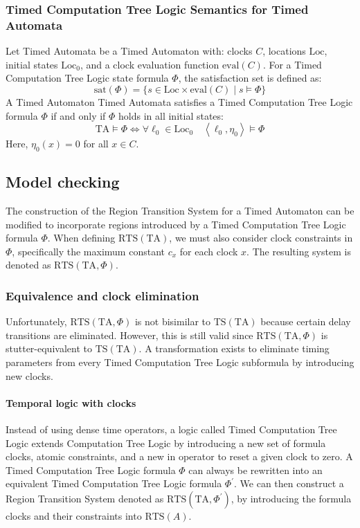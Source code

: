 \subsubsection{Timed Computation Tree Logic Semantics for Timed Automata}
Let Timed Automata be a Timed Automaton with: clocks $C$, locations $\text{Loc}$, initial states $\text{Loc}_0$, and a clock evaluation function $\text{eval}(C)$. 
For a Timed Computation Tree Logic state formula $\Phi$, the satisfaction set is defined as:
\[\text{sat}(\Phi)=\{s\in\text{Loc}\times\text{eval}(C)\mid s\models\Phi\}\]
A Timed Automaton Timed Automata satisfies a Timed Computation Tree Logic formula $\Phi$ if and only if $\Phi$ holds in all initial states:
\[\text{TA}\models\Phi\Leftrightarrow\forall\ell_0\in\text{Loc}_0\quad\left\langle \ell_0,\eta_0\right\rangle\models\Phi \]
Here, $\eta_0(x)=0$ for all $x\in C$. 

\subsection{Model checking}
The construction of the Region Transition System for a Timed Automaton can be modified to incorporate regions introduced by a Timed Computation Tree Logic formula $\Phi$. 
When defining $\text{RTS}(\text{TA})$, we must also consider clock constraints in $\Phi$, specifically the maximum constant $c_x$ for each clock $x$.
The resulting system is denoted as $\text{RTS}(\text{TA},\Phi)$. 

\subsubsection{Equivalence and clock elimination}
Unfortunately, $\text{RTS}(\text{TA},\Phi)$ is not bisimilar to $\text{TS}(\text{TA})$ because certain delay transitions are eliminated.
However, this is still valid since $\text{RTS}(\text{TA},\Phi)$ is stutter-equivalent to $\text{TS}(\text{TA})$.
A transformation exists to eliminate timing parameters from every Timed Computation Tree Logic subformula by introducing new clocks.

\paragraph*{Temporal logic with clocks}
Instead of using dense time operators, a logic called Timed Computation Tree Logic extends Computation Tree Logic by introducing a new set of formula clocks, atomic constraints, and a new in operator to reset a given clock to zero.
A Timed Computation Tree Logic formula $\Phi$ can always be rewritten into an equivalent Timed Computation Tree Logic formula $\Phi^\prime$.
We can then construct a Region Transition System  denoted as $\text{RTS}(\text{TA},\Phi^\prime)$, by introducing the formula clocks and their constraints into $\text{RTS}(A)$.

